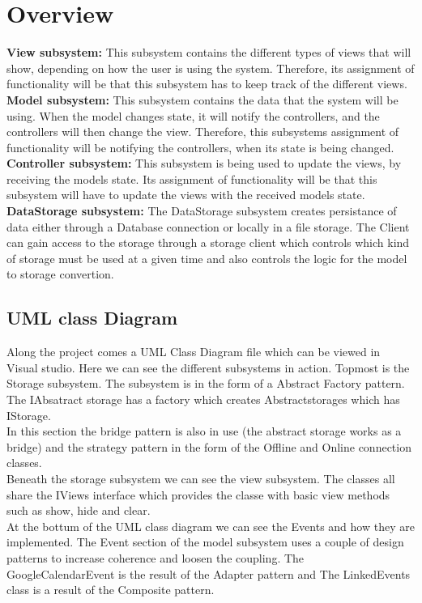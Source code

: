 \section{Overview}
\textbf{View subsystem:}
This subsystem contains the different types of views that will show, depending on how the user is 
using the system. Therefore, its assignment of functionality will be that this subsystem 
has to keep track of the different views.\\
\textbf{Model subsystem:}
This subsystem contains the data that the system will be using. When the model changes state, 
it will notify the controllers, and the controllers will then change the view. Therefore, 
this subsystems assignment of functionality will be notifying the controllers, 
when its state is being changed.\\
\textbf{Controller subsystem:}
This subsystem is being used to update the views, by receiving the models state. 
Its assignment of functionality will be that this subsystem will have to update the views 
with the received models state.\\
\textbf{DataStorage subsystem:}
The DataStorage subsystem creates persistance of data either through a Database connection or locally in a file storage. The Client can gain access to the storage through a storage client which controls which kind of storage must be used at a given time and also controls the logic for the model to storage convertion. 

\subsection{UML class Diagram}
Along the project comes a UML Class Diagram file which can be viewed in Visual studio. Here we can see the different subsystems in action. Topmost is the Storage subsystem. The subsystem is in the form of a Abstract Factory pattern. The IAbsatract storage has a factory which creates Abstractstorages which has IStorage. \\In this section the bridge pattern is also in use (the abstract storage works as a bridge) and the strategy pattern in the form of the Offline and Online connection classes.\\

Beneath the storage subsystem we can see the view subsystem. The classes all share the IViews interface which provides the classe with basic view methods such as show, hide and clear.\\

At the bottum of the UML class diagram we can see the Events and how they are implemented. The Event section of the model subsystem uses a couple of design patterns to increase coherence and loosen the coupling. The GoogleCalendarEvent is the result of the Adapter pattern and The LinkedEvents class is a result of the Composite pattern.